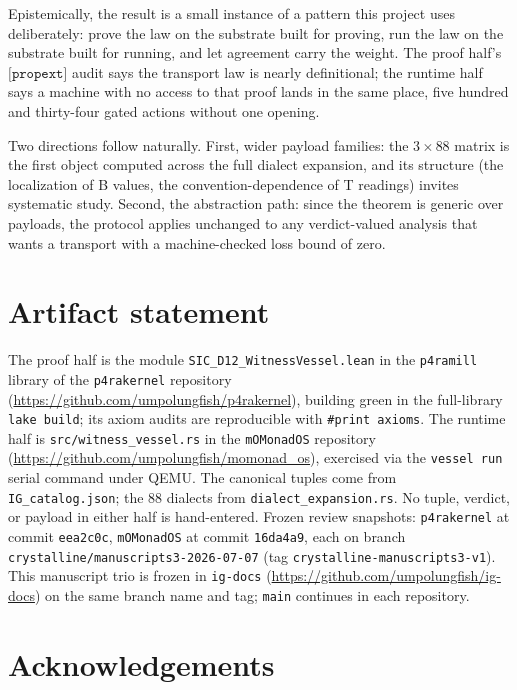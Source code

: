\documentclass[12pt,a4paper]{article}
\newcommand{\bT}{\textsf{T}}
\newcommand{\bB}{\textsf{B}}
\begin{document}
Epistemically, the result is a small instance of a pattern this project
uses deliberately: prove the law on the substrate built for proving, run
the law on the substrate built for running, and let agreement carry the
weight. The proof half's $\texttt{[propext]}$ audit says the transport law
is nearly definitional; the runtime half says a machine with no access to
that proof lands in the same place, five hundred and thirty-four gated
actions without one opening.

Two directions follow naturally. First, wider payload families: the
$3 \times 88$ matrix is the first object computed across the full dialect
expansion, and its structure (the localization of \bB{} values, the
convention-dependence of \bT{} readings) invites systematic study. Second,
the abstraction path: since the theorem is generic over payloads, the
protocol applies unchanged to any verdict-valued analysis that wants a
transport with a machine-checked loss bound of zero.

\section{Artifact statement}

The proof half is the module \texttt{SIC\_D12\_WitnessVessel.lean} in the
\texttt{p4ramill} library of the \texttt{p4rakernel} repository
(\url{https://github.com/umpolungfish/p4rakernel}), building green in the
full-library \texttt{lake build}; its axiom audits are reproducible with
\texttt{\#print axioms}. The runtime half is \texttt{src/witness\_vessel.rs}
in the \texttt{mOMonadOS} repository
(\url{https://github.com/umpolungfish/momonad_os}), exercised via the
\texttt{vessel run} serial command under QEMU. The canonical tuples come from
\texttt{IG\_catalog.json}; the $88$ dialects from \texttt{dialect\_expansion.rs}.
No tuple, verdict, or payload in either half is hand-entered. Frozen review
snapshots: \texttt{p4rakernel} at commit \texttt{eea2c0c}, \texttt{mOMonadOS} at
commit \texttt{16da4a9}, each on branch \texttt{crystalline/manuscripts3-2026-07-07}
(tag \texttt{crystalline-manuscripts3-v1}). This manuscript trio is frozen in
\texttt{ig-docs} (\url{https://github.com/umpolungfish/ig-docs}) on the same
branch name and tag; \texttt{main} continues in each repository.

\section{Acknowledgements}
\end{document}
